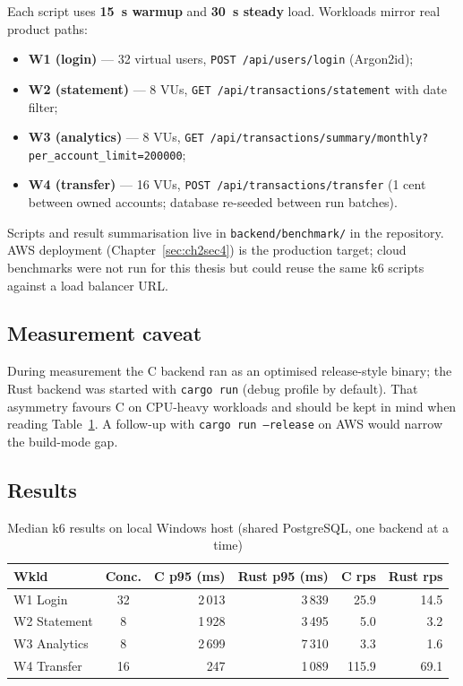 \par Each script uses \textbf{15~s warmup} and \textbf{30~s steady} load. Workloads mirror 
real product paths:

\begin{itemize}
  \item \textbf{W1 (login)} --- 32 virtual users, \texttt{POST /api/users/login} (Argon2id);
  \item \textbf{W2 (statement)} --- 8 VUs, \texttt{GET /api/transactions/statement} with date filter;
  \item \textbf{W3 (analytics)} --- 8 VUs, \texttt{GET /api/transactions/summary/monthly?per\_account\_limit=200000};
  \item \textbf{W4 (transfer)} --- 16 VUs, \texttt{POST /api/transactions/transfer} (1 cent between owned accounts; database re-seeded between run batches).
\end{itemize}

\par Scripts and result summarisation live in \texttt{backend/benchmark/} in the repository. 
AWS deployment (Chapter~\ref{sec:ch2sec4}) is the production target; cloud benchmarks were 
not run for this thesis but could reuse the same k6 scripts against a load balancer URL.

\subsection{Measurement caveat}
\label{subsec:ch8sec2caveat}

\par During measurement the C backend ran as an optimised release-style binary; the Rust 
backend was started with \texttt{cargo run} (debug profile by default). That asymmetry 
favours C on CPU-heavy workloads and should be kept in mind when reading Table~\ref{tab:k6_results}. 
A follow-up with \texttt{cargo run --release} on AWS would narrow the build-mode gap.

\subsection{Results}
\label{subsec:ch8sec2results}

\begin{table}[htbp]
\centering
\begin{tabular}{|l|c|r|r|r|r|}
\hline
\textbf{Wkld} & \textbf{Conc.} & \textbf{C p95 (ms)} & \textbf{Rust p95 (ms)} &
\textbf{C rps} & \textbf{Rust rps} \\
\hline
W1 Login & 32 & 2\,013 & 3\,839 & 25.9 & 14.5 \\
W2 Statement & 8 & 1\,928 & 3\,495 & 5.0 & 3.2 \\
W3 Analytics & 8 & 2\,699 & 7\,310 & 3.3 & 1.6 \\
W4 Transfer & 16 & 247 & 1\,089 & 115.9 & 69.1 \\
\hline
\end{tabular}
\caption{Median k6 results on local Windows host (shared PostgreSQL, one backend at a time)}
\label{tab:k6_results}
\end{table}

